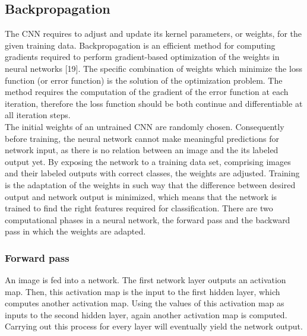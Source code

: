     \subsection{Backpropagation}
    The CNN requires to adjust and update its kernel parameters, or weights, for the given training data. Backpropagation\cite{werbos1990backpropagation} is an efficient method for computing gradients required to perform gradient-based optimization of the weights in neural networks [19]. The specific combination of weights which minimize the loss function (or error function) is the solution of the optimization problem. The method requires the computation of the gradient of the error function at each iteration, therefore the loss function should be both continue and differentiable at all iteration steps.\\

    The initial weights of an untrained CNN are randomly chosen. Consequently before training, the neural network cannot make meaningful predictions for network input, as there is no relation between an image and the its labeled output yet. By exposing the network to a training data set, comprising images and their labeled outputs with correct classes, the weights are adjusted. Training is the adaptation of the weights in such way that the difference between desired output and network output is minimized, which means that the network is trained to find the right features required for classification. There are two computational phases in a neural network, the forward pass and the backward pass in which the weights are adapted.

    \subsubsection{Forward pass}
    An image is fed into a network. The first network layer outputs an activation map. Then, this activation map is the input to the first hidden layer, which computes another activation map. Using the values of this activation map as inputs to the second hidden layer, again another activation map is computed. Carrying out this process for every layer will eventually yield the network output.

